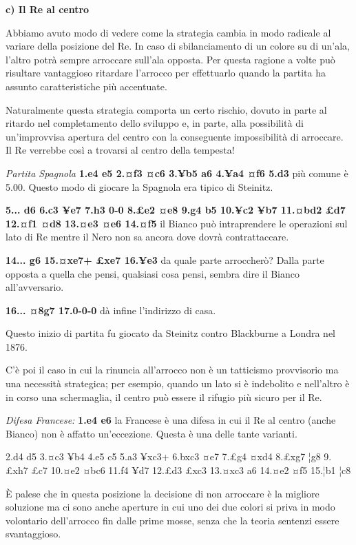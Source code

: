 \textbf{c) Il Re al centro}

Abbiamo avuto modo di vedere come la strategia cambia in modo radicale
al variare della posizione del Re. In caso di sbilanciamento di un
colore su di un'ala, l'altro potrà sempre arroccare sull'ala opposta.
Per questa ragione a volte può risultare vantaggioso ritardare l'arrocco
per effettuarlo quando la partita ha assunto caratteristiche più
accentuate.

Naturalmente questa strategia comporta un certo rischio, dovuto in parte
al ritardo nel completamento dello sviluppo e, in parte, alla
possibilità di un'improvvisa apertura del centro con la conseguente
impossibilità di arroccare. Il Re verrebbe così a trovarsi al centro
della tempesta!

\emph{Partita Spagnola} \textbf{1.e4 e5 2.¤f3 ¤c6 3.¥b5 a6 4.¥a4 ¤f6
5.d3} più comune è 5.00. Questo modo di giocare la Spagnola era tipico
di Steinitz.

\textbf{5... d6 6.c3 ¥e7 7.h3 0-0 8.£e2 ¤e8 9.g4 b5 10.¥c2 ¥b7 11.¤bd2
£d7 12.¤f1 ¤d8 13.¤e3 ¤e6 14.¤f5} il Bianco può intraprendere le
operazioni sul lato di Re mentre il Nero non sa ancora dove dovrà
contrattaccare.

\textbf{14... g6 15.¤xe7+ £xe7 16.¥e3} da quale parte arroccherò? Dalla
parte opposta a quella che pensi, qualsiasi cosa pensi, sembra dire il
Bianco all'avversario.

\textbf{16... ¤8g7 17.0-0-0} dà infine l'indirizzo di casa.

Questo inizio di partita fu giocato da Steinitz contro Blackburne a
Londra nel 1876.

C'è poi il caso in cui la rinuncia all'arrocco non è un tatticismo
provvisorio ma una necessità strategica; per esempio, quando un lato si
è indebolito e nell'altro è in corso una schermaglia, il centro può
essere il rifugio più sicuro per il Re.

\emph{Difesa Francese:} \textbf{1.e4 e6} la Francese è una difesa in cui
il Re al centro (anche Bianco) non è affatto un'eccezione. Questa è una
delle tante varianti.

2.d4 d5 3.¤c3 ¥b4 4.e5 c5 5.a3 ¥xc3+ 6.bxc3 ¤e7 7.£g4 ¤xd4 8.£xg7 ¦g8
9.£xh7 £c7 10.¤e2 ¤bc6 11.f4 ¥d7 12.£d3 £xc3 13.¤xc3 a6 14.¤e2 ¤f5
15.¦b1 ¦c8

È palese che in questa posizione la decisione di non arroccare è la
migliore soluzione ma ci sono anche aperture in cui uno dei due colori
si priva in modo volontario dell'arrocco fin dalle prime mosse, senza
che la teoria sentenzi essere svantaggioso.

